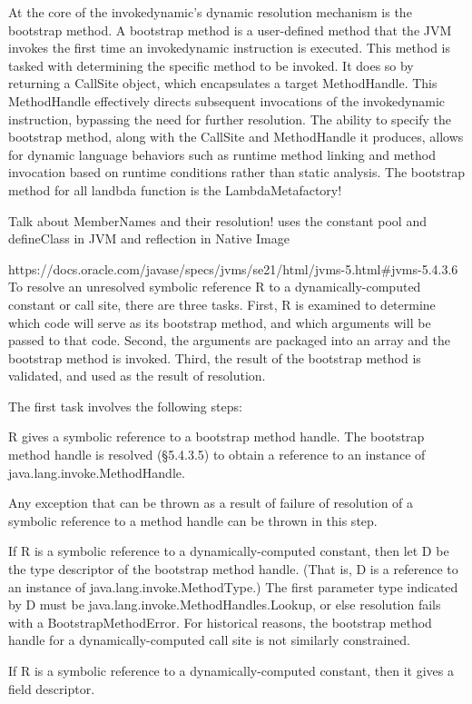 At the core of the invokedynamic's dynamic resolution mechanism is the bootstrap method. A bootstrap method is a user-defined method that the JVM invokes the first time an invokedynamic instruction is executed. This method is tasked with determining the specific method to be invoked. It does so by returning a CallSite object, which encapsulates a target MethodHandle. This MethodHandle effectively directs subsequent invocations of the invokedynamic instruction, bypassing the need for further resolution. The ability to specify the bootstrap method, along with the CallSite and MethodHandle it produces, allows for dynamic language behaviors such as runtime method linking and method invocation based on runtime conditions rather than static analysis.
The bootstrap method for all landbda function is the LambdaMetafactory!

Talk about MemberNames and their resolution! uses the constant pool and defineClass in JVM and reflection in Native Image

https://docs.oracle.com/javase/specs/jvms/se21/html/jvms-5.html#jvms-5.4.3.6
To resolve an unresolved symbolic reference R to a dynamically-computed constant or call site, there are three tasks. First, R is examined to determine which code will serve as its bootstrap method, and which arguments will be passed to that code. Second, the arguments are packaged into an array and the bootstrap method is invoked. Third, the result of the bootstrap method is validated, and used as the result of resolution.

The first task involves the following steps:

    R gives a symbolic reference to a bootstrap method handle. The bootstrap method handle is resolved (§5.4.3.5) to obtain a reference to an instance of java.lang.invoke.MethodHandle.

    Any exception that can be thrown as a result of failure of resolution of a symbolic reference to a method handle can be thrown in this step.

    If R is a symbolic reference to a dynamically-computed constant, then let D be the type descriptor of the bootstrap method handle. (That is, D is a reference to an instance of java.lang.invoke.MethodType.) The first parameter type indicated by D must be java.lang.invoke.MethodHandles.Lookup, or else resolution fails with a BootstrapMethodError. For historical reasons, the bootstrap method handle for a dynamically-computed call site is not similarly constrained.

    If R is a symbolic reference to a dynamically-computed constant, then it gives a field descriptor.

